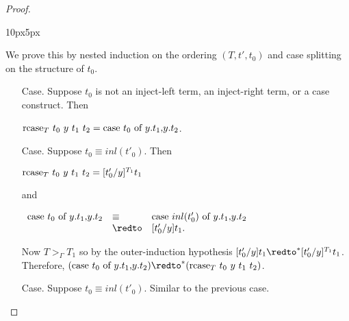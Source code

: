 \begin{proof}
\begin{changemargin}{10px}{5px}
\begin{itemize}
    We prove this by nested induction on the ordering $(T,t',t_0)$ and case splitting on
    the structure of $t_0$.  
    \begin{itemize}
    \item[Case.] Suppose $t_0$ is not an inject-left term, an inject-right term, or a case construct.  Then
      \begin{center}
        $\mbox{rcase}_{T}\ t_0\ y\ t_1\ t_2 = \mbox{case}\ t_0\ \text{of}\ y\text{.}t_1\text{,}y\text{.}t_2$.
      \end{center}
      
    \item[Case.] Suppose $t_0 \equiv inl(t'_0)$.  Then 
      \begin{center}
        $\mbox{rcase}_{T}\ t_0\ y\ t_1\ t_2 = [t'_0/y]^{T_1} t_1$
      \end{center}
      and
      \begin{center}
        \begin{math}
          \begin{array}{lll}
            \ccon{t_0}{y}{t_1}{t_2} & \equiv & \ccon{inl(t'_0)}{y}{t_1}{t_2}\\
            & \redto & [t'_0/y]t_1.
          \end{array}
        \end{math}
      \end{center}
      Now $T >_{\Gamma} T_1$ so by the outer-induction hypothesis 
      $[t'_0/y]t_1 \redto^* [t'_0/y]^{T_1} t_1$.  Therefore, 
      $(\ccon{t_0}{y}{t_1}{t_2}) \redto^* (\rcase{T}{t_0}{y}{t_1}{t_2})$.
      
    \item[Case.] Suppose $t_0 \equiv inl(t'_0)$.  Similar to the previous case.
      

\end{itemize}
\end{itemize}
\end{changemargin}
\end{proof}
